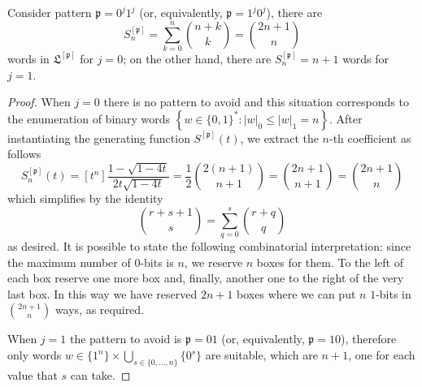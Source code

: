 \begin{corollary}
Consider pattern $\mathfrak{p}=0^{j}1^{j}$ (or, equivalently,
$\mathfrak{p}=1^{j}0^{j}$), there are
\begin{displaymath}
S_{n}^{[\mathfrak{p}]}=\sum_{k=0}^{n}{{{n+k}\choose{k}}}={{2n+1}\choose{n}}
\end{displaymath}
words in $\mathfrak{L}^{[\mathfrak{p}]}$ for $j=0$; on the other hand, there
are $S_{n}^{[\mathfrak{p}]} = n+1$ words for $j=1$.
\end{corollary}

\begin{proof}
When $j=0$ there is no pattern to avoid and this situation corresponds to the
enumeration of binary words $\left\lbrace w\in \lbrace 0,1 \rbrace^{*}: |w|_{0}
\leq |w|_{1}=n\right\rbrace$.  After instantiating the generating function
$S^{[\mathfrak{p}]}(t)$, we extract the $n$-th coefficient as follows
\begin{displaymath}
[t^{n}] S_{n}^{[\mathfrak{p}]}(t) =[t^{n}]\frac{1-\sqrt{1-4t}}{2t\sqrt{1-4t}}
= \frac{1}{2}{{2(n+1)}\choose{n+1}}
= {{2n+1}\choose{n+1}}
= {{2n+1}\choose{n}}
\end{displaymath}
which simplifies by the identity
\begin{displaymath}
{{r+s+1}\choose{s}} = \sum_{q=0}^{s}{{{r+q}\choose{q}}}
\end{displaymath}
as desired. It is possible to state the following combinatorial interpretation:
since the maximum number of $0$-bits  is $n$, we reserve $n$ boxes for them. To the
left of each box reserve one more box and, finally, another one to the right of
the very last box. In this way we have reserved $2n+1$ boxes where we can put
$n$ $1$-bits  in ${{2n+1}\choose{n}}$ ways, as required.

When $j=1$ the pattern to avoid is $\mathfrak{p}=01$ (or, equivalently,
$\mathfrak{p}=10$), therefore only words $w \in   \lbrace 1^{n}
\rbrace\times\bigcup_{s\in \lbrace 0,\ldots,n \rbrace}\lbrace 0^{s} \rbrace$
are suitable, which are $n+1$, one for each value that $s$ can take.
\end{proof}

